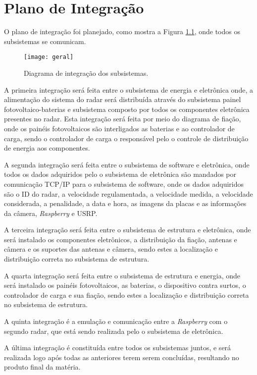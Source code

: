 \chapter{Plano de Integração}

O plano de integração foi planejado, como mostra a Figura \ref{fig:planejamento_integracao}, onde todos os subsistemas se comunicam.

\begin{figure}[H]
    \centering
    \texttt{[image: geral]}
    \caption{Diagrama de integração dos subsistemas.}
    \label{fig:planejamento_integracao}
\end{figure}

A primeira integração será feita entre o subsistema de energia e eletrônica onde, a alimentação do sistema do radar será distribuída através do subsistema painel fotovoltaico-baterias e subsistema composto por todos os componentes eletrônica presentes no radar. Esta integração será feita por meio do diagrama de fiação, onde os painéis fotovoltaicos são interligados as baterias e ao controlador de carga, sendo o controlador de carga o responsável pelo o controle de distribuição de energia aos componentes.

A segunda integração será feita entre o subsistema de software e eletrônica, onde todos os dados adquiridos pelo o subsistema de eletrônica são mandados por comunicação TCP/IP para o subsistema de software, onde os dados adquiridos são o ID do radar, a velocidade regulamentada, a velocidade medida, a velocidade considerada, a penalidade, a data e hora, as imagens da placas e as informações da câmera, \emph{Raspberry} e USRP.

A terceira integração será feita entre o subsistema de estrutura e eletrônica, onde será instalado os componentes eletrônicos, a distribuição da fiação, antenas e câmera e os suportes das antenas e câmera, sendo estes a localização e distribuição correta no subsistema de estrutura.

A quarta integração será feita entre o subsistema de estrutura e energia, onde será instalado os painéis fotovoltaicos, as baterias, o dispositivo contra surtos, o controlador de carga e sua fiação, sendo estes a localização e distribuição correta no subsistema de estrutura.

A quinta integração é a emulação e comunicação entre a \emph{Raspberry} com o segundo radar, que está sendo realizada pelo o subsistema de eletrônica.

A última integração é constituída entre todos os subsistemas juntos, e será realizada logo após todas as anteriores terem serem concluídas, resultando no produto final da matéria.